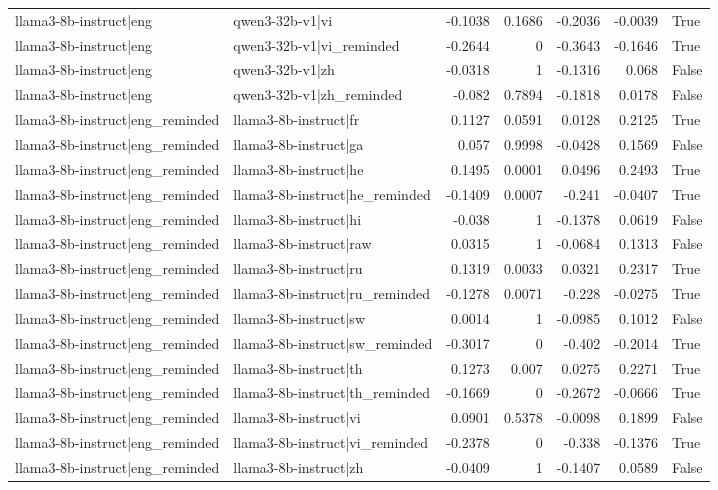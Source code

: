 \begin{table}
\begin{tabular}{l l r r r r l}
llama3-8b-instruct|eng & qwen3-32b-v1|vi & -0.1038 & 0.1686 & -0.2036 & -0.0039 & True \\
llama3-8b-instruct|eng & qwen3-32b-v1|vi_reminded & -0.2644 & 0 & -0.3643 & -0.1646 & True \\
llama3-8b-instruct|eng & qwen3-32b-v1|zh & -0.0318 & 1 & -0.1316 & 0.068 & False \\
llama3-8b-instruct|eng & qwen3-32b-v1|zh_reminded & -0.082 & 0.7894 & -0.1818 & 0.0178 & False \\
llama3-8b-instruct|eng_reminded & llama3-8b-instruct|fr & 0.1127 & 0.0591 & 0.0128 & 0.2125 & True \\
llama3-8b-instruct|eng_reminded & llama3-8b-instruct|ga & 0.057 & 0.9998 & -0.0428 & 0.1569 & False \\
llama3-8b-instruct|eng_reminded & llama3-8b-instruct|he & 0.1495 & 0.0001 & 0.0496 & 0.2493 & True \\
llama3-8b-instruct|eng_reminded & llama3-8b-instruct|he_reminded & -0.1409 & 0.0007 & -0.241 & -0.0407 & True \\
llama3-8b-instruct|eng_reminded & llama3-8b-instruct|hi & -0.038 & 1 & -0.1378 & 0.0619 & False \\
llama3-8b-instruct|eng_reminded & llama3-8b-instruct|raw & 0.0315 & 1 & -0.0684 & 0.1313 & False \\
llama3-8b-instruct|eng_reminded & llama3-8b-instruct|ru & 0.1319 & 0.0033 & 0.0321 & 0.2317 & True \\
llama3-8b-instruct|eng_reminded & llama3-8b-instruct|ru_reminded & -0.1278 & 0.0071 & -0.228 & -0.0275 & True \\
llama3-8b-instruct|eng_reminded & llama3-8b-instruct|sw & 0.0014 & 1 & -0.0985 & 0.1012 & False \\
llama3-8b-instruct|eng_reminded & llama3-8b-instruct|sw_reminded & -0.3017 & 0 & -0.402 & -0.2014 & True \\
llama3-8b-instruct|eng_reminded & llama3-8b-instruct|th & 0.1273 & 0.007 & 0.0275 & 0.2271 & True \\
llama3-8b-instruct|eng_reminded & llama3-8b-instruct|th_reminded & -0.1669 & 0 & -0.2672 & -0.0666 & True \\
llama3-8b-instruct|eng_reminded & llama3-8b-instruct|vi & 0.0901 & 0.5378 & -0.0098 & 0.1899 & False \\
llama3-8b-instruct|eng_reminded & llama3-8b-instruct|vi_reminded & -0.2378 & 0 & -0.338 & -0.1376 & True \\
llama3-8b-instruct|eng_reminded & llama3-8b-instruct|zh & -0.0409 & 1 & -0.1407 & 0.0589 & False \\

\end{tabular}
\end{table}
